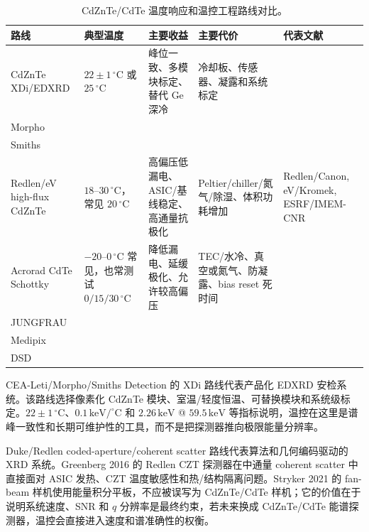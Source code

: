 \documentclass[
  aps,
  prd,
  reprint,
  superscriptaddress,
  floatfix,
  amsmath,
  amssymb
]{revtex4-2}
\newcommand{\degc}{^\circ\mathrm{C}}
\newcommand{\tcell}[2][0.18\textwidth]{\begin{minipage}[t]{#1}\raggedright #2\end{minipage}}
\begin{document}
\begin{table}[t]
\caption{CdZnTe/CdTe 温度响应和温控工程路线对比。}
\label{tab:temperature}
\centering
\small
\renewcommand{\arraystretch}{1.18}
\begin{tabular}{@{}lllll@{}}
\toprule
\tcell[0.15\textwidth]{路线} & \tcell[0.14\textwidth]{典型温度} & \tcell[0.20\textwidth]{主要收益} & \tcell[0.22\textwidth]{主要代价} & \tcell[0.18\textwidth]{代表文献} \\
\midrule
\tcell[0.15\textwidth]{CdZnTe XDi/EDXRD} & \tcell[0.14\textwidth]{$22\pm1\,\degc$ 或 $25\,\degc$} & \tcell[0.20\textwidth]{峰位一致、多模块标定、替代 Ge 深冷} & \tcell[0.22\textwidth]{冷却板、传感器、凝露和系统标定} & \tcell[0.18\textwidth]{CEA-Leti\\Morpho\\Smiths\cite{kosciesza2013,montemont2013}} \\
\tcell[0.15\textwidth]{Redlen/eV high-flux CdZnTe} & \tcell[0.14\textwidth]{$18$--$30\,\degc$，常见 $20\,\degc$} & \tcell[0.20\textwidth]{高偏压低漏电、ASIC/基线稳定、高通量抗极化} & \tcell[0.22\textwidth]{Peltier/chiller/氮气/除湿、体积功耗增加} & \tcell[0.18\textwidth]{Redlen/Canon, eV/Kromek, ESRF/IMEM-CNR\cite{veale2020,cline2024,prokesch2016,baussens2022,bettelli2023}} \\
\tcell[0.15\textwidth]{Acrorad CdTe Schottky} & \tcell[0.14\textwidth]{$-20$--$0\,\degc$ 常见，也常测试 $0/15/30\,\degc$} & \tcell[0.20\textwidth]{降低漏电、延缓极化、允许较高偏压} & \tcell[0.22\textwidth]{TEC/水冷、真空或氮气、防凝露、bias reset 死时间} & \tcell[0.18\textwidth]{Acrorad CdTe\\JUNGFRAU\\Medipix\\DSD\cite{astromskas2016,becker2017,meyer2022,minami2023,franklin2024}} \\
\bottomrule
\end{tabular}
\end{table}

CEA-Leti/Morpho/Smiths Detection 的 XDi 路线代表产品化 EDXRD 安检系统。该路线选择像素化 CdZnTe 模块、室温/轻度恒温、可替换模块和系统级标定。$22\pm1\,\degc$、$0.1\,\mathrm{keV}/\degc$ 和 $2.26\,\mathrm{keV}$ @ $59.5\,\mathrm{keV}$ 等指标说明，温控在这里是谱峰一致性和长期可维护性的工具，而不是把探测器推向极限能量分辨率\cite{kosciesza2013,montemont2013}。

Duke/Redlen coded-aperture/coherent scatter 路线代表算法和几何编码驱动的 XRD 系统。Greenberg 2016 的 Redlen CZT 探测器在中通量 coherent scatter 中直接面对 ASIC 发热、CZT 温度敏感性和热/结构隔离问题\cite{greenberg2016}。Stryker 2021 的 fan-beam 样机使用能量积分平板，不应被误写为 CdZnTe/CdTe 样机；它的价值在于说明系统速度、SNR 和 $q$ 分辨率是最终约束，若未来换成 CdZnTe/CdTe 能谱探测器，温控会直接进入速度和谱准确性的权衡\cite{stryker2021}。
\end{document}

